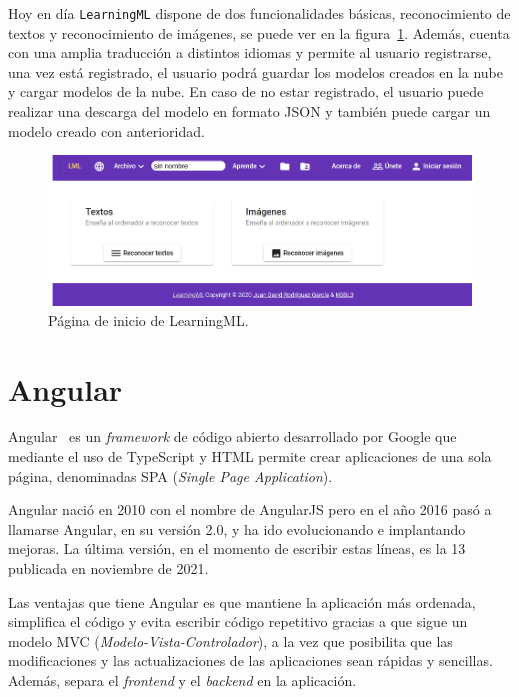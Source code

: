 \documentclass[a4paper, 12pt]{book}
\begin{document}
Hoy en día \texttt{LearningML} dispone de dos funcionalidades básicas, reconocimiento de textos y reconocimiento de imágenes, se puede ver en la figura~\ref{fig:learningML}.
Además, cuenta con una amplia traducción a distintos idiomas y  permite al usuario registrarse, una vez está registrado, el usuario podrá guardar los modelos creados en la nube y cargar modelos de la nube. En caso de no estar registrado, el usuario puede realizar una descarga del modelo en formato JSON y también puede cargar un modelo creado con anterioridad.

\begin{figure}
	\centering
	\includegraphics[width=13cm, keepaspectratio]{img/LearningML.png}
	\caption{Página de inicio de LearningML.} \label{fig:learningML}
\end{figure}

\section{Angular} 
\label{sec:Angular}

Angular~\cite{Pagina_de_angular, Curso_de_angular} es un \emph{framework} de código abierto desarrollado por Google que mediante el uso de TypeScript y HTML permite crear aplicaciones de una sola página, denominadas SPA (\emph{Single Page Application}).

Angular nació en 2010 con el nombre de AngularJS pero en el año 2016 pasó a llamarse Angular, en su versión 2.0, y ha ido evolucionando e implantando mejoras. 
La última versión, en el momento de escribir estas líneas, es la 13 publicada en noviembre de 2021.

Las ventajas que tiene Angular es que mantiene la aplicación más ordenada, simplifica el código y evita escribir código repetitivo gracias a que sigue un modelo MVC (\emph{Modelo-Vista-Controlador}), a la vez que posibilita que las modificaciones y las actualizaciones de las aplicaciones sean rápidas y sencillas. 
Además, separa el \emph{frontend} y el \emph{backend} en la aplicación.
\end{document}
